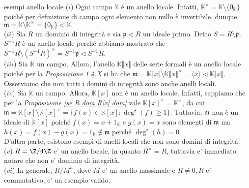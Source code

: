 \begin{example}[]{esempi anello locale}
  ($i$) Ogni campo $\mathbb{K}$ è un anello locale. Infatti, $\mathbb{K}^{\times}=\mathbb{K}\setminus \{0_{\mathbb{K}}\}$ 
  poiché per definizione di campo ogni elemento non nullo è invertibile, dunque 
  $\mathfrak{m}=\mathbb{K}\setminus\mathbb{K}^{\times}=\{0_{\mathbb{K}}\}\lhd \mathbb{K}.$\\

  \noindent ($ii$) Sia $R$ un dominio di integrità e sia $\mathfrak{p}\lhd R$ un ideale primo. Detto $S=R\setminus \mathfrak{p}$, $S^{-1}R$ 
  è un anello locale perché abbiamo mostrato che $S^{-1}R \setminus (S^{-1}R)^{\times}=S^{-1}\mathfrak{p}\lhd S^{-1}R.$\\

  \noindent ($iii$) Sia $\mathbb{K}$ un campo. Allora, l'anello $\mathbb{K}\llbracket x\rrbracket$ delle serie formali è un anello locale poiché 
  per la \emph{Proposizione 1.4.X} si ha che $\mathfrak{m}=\mathbb{K}\llbracket x\rrbracket\setminus\mathbb{K}\llbracket x\rrbracket^{\times}=\langle x 
  \rangle\lhd \mathbb{K}\llbracket x\rrbracket.$\\

  \noindent Osserviamo che non tutti i domini di integrità sono anche anelli locali.\\

  \noindent ($iv$) Sia $\mathbb{K}$ un campo. Allora, $\mathbb{K}[x]$ non è un anello locale. Infatti, sappiamo che per la 
  \emph{Proposizione \ref{se R dom R[x] dom}} vale $\mathbb{K}[x]^{\times}=\mathbb{K}^{\times}$, 
  da cui $\mathfrak{m}=\mathbb{K}[x]\setminus\mathbb{K}[x]^{\times}=\{f(x)\in \mathbb{K}[x]: \deg^{\star}(f)\geq 1\}$. 
  Tuttavia, $\mathfrak{m}$ non è un ideale di $\mathbb{K}[x]$ poiché $f(x)=x+1_{\mathbb{K}}$ e $g(x)=x$ sono elementi 
  di $\mathfrak{m}$ ma $h(x)=f(x)-g(x)=1_{\mathbb{K}}\not\in \mathfrak{m}$ perché $\deg^{\star}(h)=0.$\\

  \noindent D'altra parte, esistono esempi di anelli locali che non sono domini di integrità.\\

  \noindent ($v$) $R = \Z/4\Z$ e' un anello locale, in quanto $R^{\times} = R$, tuttavia e' immediato notare che non e' dominio di integrità.\\

  \noindent ($vi$) In generale, $R/M^{n}$, dove $M$ e' un anello massimale e $R \neq {0}, R$ e' commutativo, e' un esempio valido.
\end{example}

